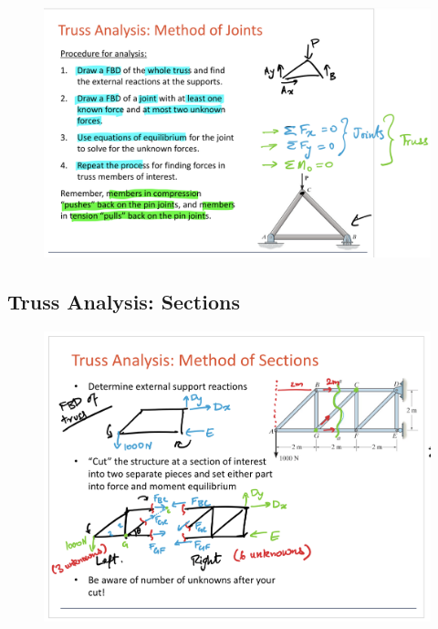 \begin{figure}[!h]
\centering
\includegraphics[angle=0, width=5in]{TrussFigures/MethodofJoints.png}
\vspace{-2mm}
\caption{\small {}}
\vspace{-3mm}
\label{Fig:MethodofJoints}
\end{figure}

\subsection{Truss Analysis: Sections}

\begin{figure}[!h]
\centering
\includegraphics[angle=0, width=5in]{TrussFigures/MethodofSections.png}
\vspace{-2mm}
\caption{\small {}}
\vspace{-3mm}
\label{Fig:MethodofSections}
\end{figure}




